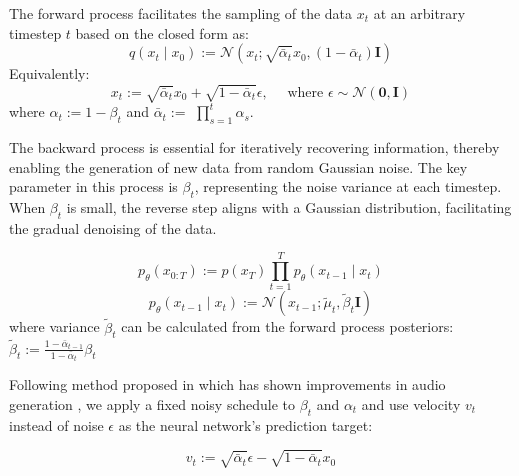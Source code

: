 \documentclass{Interspeech2024}
\begin{document}
The forward process facilitates the sampling of the data  \(x_{t}\) at an arbitrary timestep \(t\) based on the closed form as:
\begin{equation}
q\left(x_{t} \mid x_{0}\right):=\mathcal{N}\left(x_{t} ; \sqrt{\bar{\alpha}_{t}} x_{0},\left(1-\bar{\alpha}_{t}\right) \mathbf{I}\right)
\end{equation}
Equivalently:
\begin{equation}
x_{t}:=\sqrt{\bar{\alpha}_{t}} x_{0}+\sqrt{1-\bar{\alpha}_{t}} \epsilon, \quad \text { where } \epsilon \sim \mathcal{N}(\mathbf{0}, \mathbf{I})
\end{equation}
where \(\alpha_{t}:=1-\beta_{t}\) and \(\bar{\alpha}_{t}:=\) \(\prod_{s=1}^{t} \alpha_{s}\). 

The backward process is essential for iteratively recovering information, thereby enabling the generation of new data from random Gaussian noise. The key parameter in this process is \(\beta_{t}\), representing the noise variance at each timestep. When \(\beta_{t}\) is small, the reverse step aligns with a Gaussian distribution, facilitating the gradual denoising of the data.

\begin{equation}
p_{\theta}\left(x_{0: T}\right):=p\left(x_{T}\right) \prod_{t=1}^{T} p_{\theta}\left(x_{t-1} \mid x_{t}\right)
\end{equation}
\begin{equation}
p_{\theta}\left(x_{t-1} \mid x_{t}\right):=\mathcal{N}\left(x_{t-1} ; \tilde{\mu}_{t}, \tilde{\beta}_{t} \mathbf{I}\right)
\end{equation}
where variance \(\tilde{\beta}_{t}\) can be calculated from the forward process posteriors:
$\tilde{\beta}_{t}:=\frac{1-\bar{\alpha}_{t-1}}{1-\bar{\alpha}_{t}} \beta_{t}$

Following method proposed in \cite{lin2024common} which has shown improvements in audio generation \cite{hai2023dpm}, we apply a fixed noisy schedule to $\beta_{t}$ and $\alpha_{t}$ and use velocity $v_t$ instead of noise $\epsilon$ as the neural network's prediction target:

\begin{equation}
v_{t}:=\sqrt{\bar{\alpha}_{t}} \epsilon-\sqrt{1-\bar{\alpha}_{t}} x_{0}
\end{equation}
\end{document}
